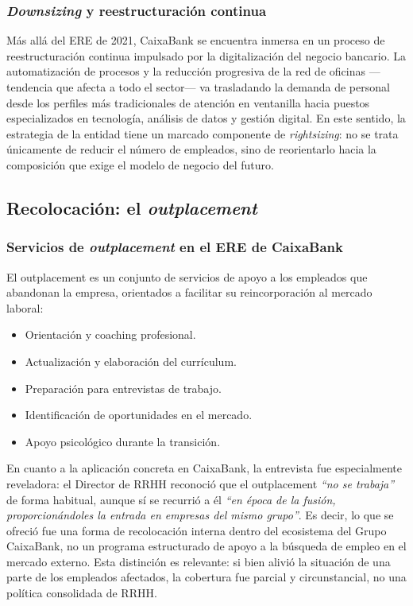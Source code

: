 \subsubsection{\textit{Downsizing} y reestructuración continua}

Más allá del ERE de 2021, CaixaBank se encuentra inmersa en un proceso de
reestructuración continua impulsado por la digitalización del negocio bancario.
La automatización de procesos y la reducción progresiva de la red de oficinas
---tendencia que afecta a todo el sector--- va trasladando la demanda de
personal desde los perfiles más tradicionales de atención en ventanilla hacia
puestos especializados en tecnología, análisis de datos y gestión digital. En
este sentido, la estrategia de la entidad tiene un marcado componente de
\textit{rightsizing}: no se trata únicamente de reducir el número de empleados,
sino de reorientarlo hacia la composición que exige el modelo de negocio del
futuro.


\subsection{Recolocación: el \textit{outplacement}}

\subsubsection{Servicios de \textit{outplacement} en el ERE de CaixaBank}

El outplacement es un conjunto de servicios de apoyo a los empleados
que abandonan la empresa, orientados a facilitar su reincorporación
al mercado laboral:

\begin{itemize}
  \item Orientación y coaching profesional.
  \item Actualización y elaboración del currículum.
  \item Preparación para entrevistas de trabajo.
  \item Identificación de oportunidades en el mercado.
  \item Apoyo psicológico durante la transición.
\end{itemize}

En cuanto a la aplicación concreta en CaixaBank, la entrevista fue
especialmente reveladora: el Director de RRHH reconoció que el outplacement
\textit{``no se trabaja''} de forma habitual, aunque sí se recurrió a
él \textit{``en época de la fusión, proporcionándoles la entrada en empresas
del mismo grupo''}. Es decir, lo que se ofreció fue una forma de
recolocación interna dentro del ecosistema del Grupo CaixaBank, no un
programa estructurado de apoyo a la búsqueda de empleo en el mercado
externo. Esta distinción es relevante: si bien alivió la situación de
una parte de los empleados afectados, la cobertura fue parcial y
circunstancial, no una política consolidada de RRHH.

